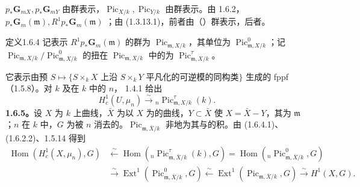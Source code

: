$p_*\mathbf G_{mX},p_*\mathbf G_{mY}$ 由群表示，$\operatorname{Pic}_{X/k},\operatorname{Pic}_{Y/k}$ 由群表示。由 1.6.2，$p_*\mathbf G_m(\mathfrak m),R^1p_*\mathbf G_m(\mathfrak m)$ ；由 (1.3.13.1)，前者由（）群表示，后者。
\begin{SGAresult}{定义}{1.6.4}
记表示 $R^1p_*\mathbf G_m(\mathfrak m)$ 的群为 $\operatorname{Pic}_{\mathfrak m,X/k}$，其单位为 $\operatorname{Pic}^0_{\mathfrak m,X/k}$；记 $\operatorname{Pic}_{\mathfrak m,X/k}/\operatorname{Pic}^0_{\mathfrak m,X/k}$ 的扭在 $\operatorname{Pic}_{\mathfrak m,X/k}$ 中的为 $\operatorname{Pic}^\tau_{\mathfrak m,X/k}$。
\end{SGAresult}
它表示由预 $S\mapsto\{S\times_kX\text{ 上沿 }S\times_kY\text{ 平凡化的可逆模的同构类}\}$ 生成的 fppf （1.5.8）。对 $k$ 及在 $k$ 中的 $n$， 1.4.1 给出
\[H_c^1(U,\mu_n)\xrightarrow\sim{}_n\operatorname{Pic}^\tau_{\mathfrak m,X/k}(k).\tag{1.6.4.1}\]
\textbf{1.6.5。}设 $X$ 为 $k$ 上曲线，$\bar X$ 为以 $X$ 为的曲线，$Y\subset\bar X$ 使 $X=\bar X-Y$，其为 $\mathfrak m$；$n$ 在 $k$ 中，$G$ 为被 $n$ 消去的。$\operatorname{Pic}_{\mathfrak m,\bar X/k}$ 非地为其与的积。由 (1.6.4.1)、(1.6.2.2)、1.5.14 得到
\[\begin{aligned}
\operatorname{Hom}(H_c^1(X,\mu_n),G)&\xleftarrow\sim\operatorname{Hom}({}_n\operatorname{Pic}^\tau_{\mathfrak m,\bar X/k}(k),G)=\operatorname{Hom}({}_n\operatorname{Pic}^0_{\mathfrak m,\bar X/k},G)\\
&\xrightarrow\sim\operatorname{Ext}^1(\operatorname{Pic}^0_{\mathfrak m,\bar X/k},G)\xleftarrow\sim\operatorname{Ext}^1(\operatorname{Pic}_{\mathfrak m,\bar X/k},G)\xrightarrow\sim H^1(X,G).
\end{aligned}\]
